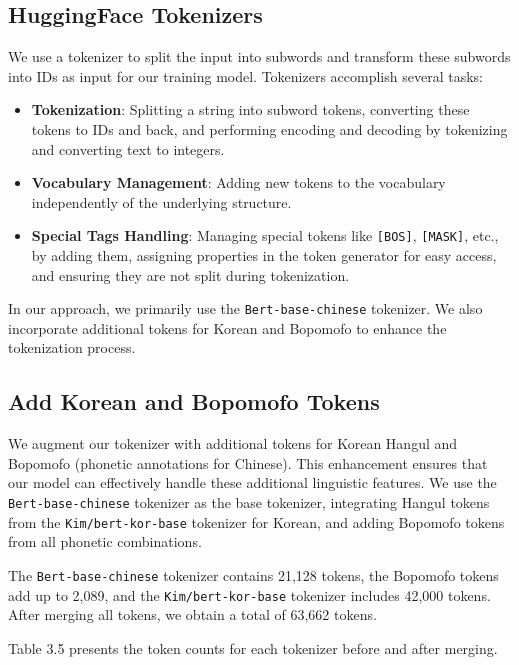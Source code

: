\documentclass[PhD]{PHlab-thesis}
\begin{document}
\subsection{HuggingFace Tokenizers}
We use a tokenizer to split the input into subwords and transform these subwords into IDs as input for our training model. Tokenizers accomplish several tasks:

\begin{itemize}
    \item \textbf{Tokenization}: Splitting a string into subword tokens, converting these tokens to IDs and back, and performing encoding and decoding by tokenizing and converting text to integers.
    \item \textbf{Vocabulary Management}: Adding new tokens to the vocabulary independently of the underlying structure.
    \item \textbf{Special Tags Handling}: Managing special tokens like \texttt{[BOS]}, \texttt{[MASK]}, etc., by adding them, assigning properties in the token generator for easy access, and ensuring they are not split during tokenization.
\end{itemize}

In our approach, we primarily use the \texttt{Bert-base-chinese} tokenizer. We also incorporate additional tokens for Korean and Bopomofo to enhance the tokenization process.


\subsection{Add Korean and Bopomofo Tokens}
We augment our tokenizer with additional tokens for Korean Hangul and Bopomofo (phonetic annotations for Chinese). This enhancement ensures that our model can effectively handle these additional linguistic features. We use the \texttt{Bert-base-chinese} tokenizer as the base tokenizer, integrating Hangul tokens from the \texttt{Kim/bert-kor-base} tokenizer for Korean, and adding Bopomofo tokens from all phonetic combinations.

The \texttt{Bert-base-chinese} tokenizer contains 21,128 tokens, the Bopomofo tokens add up to 2,089, and the \texttt{Kim/bert-kor-base} tokenizer includes 42,000 tokens. After merging all tokens, we obtain a total of 63,662 tokens. 

Table 3.5 presents the token counts for each tokenizer before and after merging.

\end{document}
